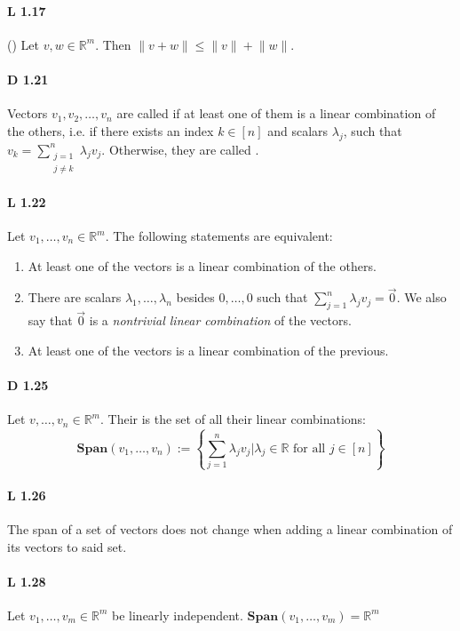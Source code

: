 \paragraph{L 1.17} () Let $v,w\in \mathbb{R}^m$. Then $\lVert v + w \rVert\le \lVert v \rVert + \lVert w \rVert$.

\paragraph{D 1.21} Vectors $v_1,v_2,\dots,v_n$ are
called  if at least one of them is a linear combination
of the others, i.e. if there exists an index $k\in[n]$ and scalars
$\lambda_j$, such that $v_k=\sum_{\substack{j=1 \\
j\not=k}}^{n}\lambda_jv_j$. Otherwise, they are called .

\paragraph{L 1.22} Let $v_1,\dots,v_n\in\mathbb{R}^m$. The
following statements are equivalent:

\begin{enumerate}
    \item At least one of the vectors is a linear combination of the others.

    \item There are scalars $\lambda_1,\dots,\lambda_n$ besides $0,\dots,0$
        such that $\sum_{j=1}^{n}\lambda_jv_j=\vec{0}$. We also say that
        $\vec{0}$ is a \textit{nontrivial linear combination} of the vectors.

    \item At least one of the vectors is a linear combination of the previous.
\end{enumerate}

\paragraph{D 1.25} Let $v,\dots,v_n\in\mathbb{R}^m$. Their
 is the set of all their linear combinations:
\begin{equation*}
    \mathbf{Span}(v_1,\dots,v_n) :=
    \left\{
        \sum_{j=1}^{n}\lambda_jv_j
        \mathrel{\Big\vert}
        \lambda_j \in\mathbb{R} \text{ for all } j\in[n]
    \right\}
\end{equation*}

\paragraph{L 1.26} The span of a set of vectors does not
change when adding a linear combination of its vectors to said set.

\paragraph{L 1.28} Let $v_1, \dots, v_m \in \mathbb{R}^m$ be linearly independent.
$\mathbf{Span}(v_1, \dots, v_m) = \mathbb{R}^m$
